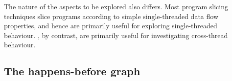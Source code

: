  The nature of the aspects to be explored
also differs.  Most program slicing techniques slice programs
according to simple single-threaded data flow properties, and hence
are primarily useful for exploring single-threaded behaviour.
{\Technique} {\StateMachines}, by contrast, are primarily useful for
investigating cross-thread behaviour.

\subsection{The happens-before graph}

